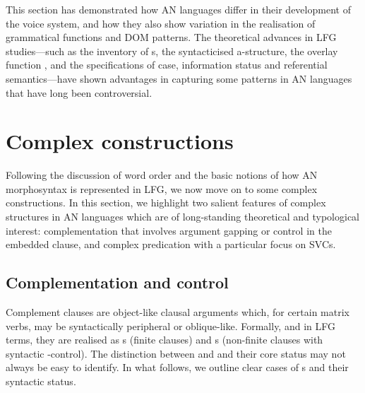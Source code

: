 \documentclass[output=paper,chinesefont]{../langscibook}
\begin{document}
This section has demonstrated how AN languages differ in their development of the voice system, and how they also show variation in the realisation of grammatical functions and DOM patterns. The theoretical advances in LFG studies—such as the inventory of {\GF}s, the syntacticised a-structure, the overlay function \PIVOT, and the specifications of case, information status and referential semantics—have shown advantages in capturing some patterns in AN languages that have long been controversial.

\section{Complex constructions}
\label{sec:Austronesian:5}

Following the discussion of word order and the basic notions of how AN morphosyntax is represented in LFG, we now move on to some complex constructions. In this section, we highlight two salient features of complex structures in AN languages which are of long-standing theoretical and typological interest: complementation that involves argument gapping or control in the embedded clause, and complex predication with a particular focus on SVCs.

\subsection{Complementation and control}
\label{sec:Austronesian:5.1}

Complement clauses are object-like clausal arguments which, for certain matrix verbs, may be syntactically peripheral or oblique-like. Formally, and in LFG terms, they are realised as {\COMP}s (finite clauses) and {\XCOMP}s (non-finite clauses with syntactic \SUBJ-control). The distinction between \COMP and \XCOMP and their core status may not always be easy to identify. In what follows, we outline clear cases of {\OPTXCOMP}s and their syntactic status.
\end{document}
